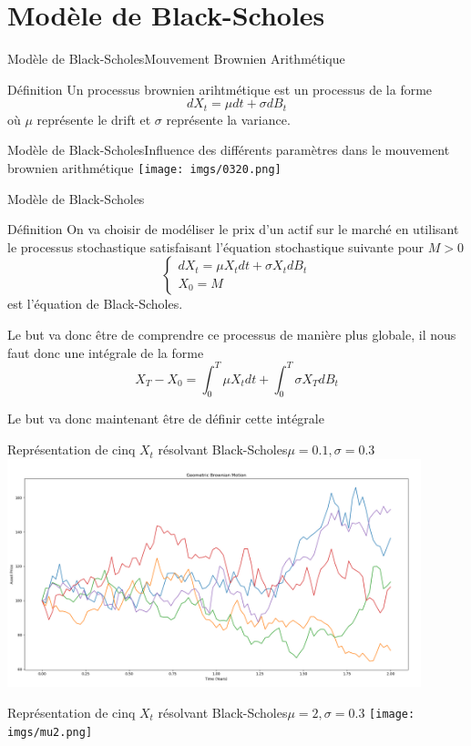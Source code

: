 \documentclass{beamer}
\newcommand{\1}{\mathmybb{1}}
\begin{document}
\section{Modèle de Black-Scholes}
\begin{frame}{Modèle de Black-Scholes}{Mouvement Brownien Arithmétique}
  \begin{block}{Définition}
    Un processus brownien arihtmétique est un processus de la forme
    \begin{equation}
      dX_{t} = \mu dt + \sigma dB_{t}
    \end{equation}
    où $\mu$ représente le drift et $\sigma$ représente la variance.
    \end{block}
  \end{frame}
  \begin{frame}{Modèle de Black-Scholes}{Influence des différents paramètres dans le mouvement brownien arithmétique}
    \texttt{[image: imgs/0320.png]}
  \end{frame}
\begin{frame}{Modèle de Black-Scholes}
  \begin{block}{Définition}
    On va choisir de modéliser le prix d'un actif sur le marché en utilisant le processus stochastique satisfaisant l'équation stochastique suivante pour $M > 0$
    \begin{equation}
      \begin{cases}
        dX_{t} = \mu X_{t} dt + \sigma X_{t} dB_{t} \\
        X_{0} = M
      \end{cases}
      \end{equation}
      est l'équation de Black-Scholes. \\
    \end{block}
    \pause
    \begin{alertblock}{}
    Le but va donc être de comprendre ce processus de manière plus globale, il nous faut donc une intégrale de la forme
    \[
      X_{T} - X_{0} = \int_0^{T} \mu X_{t} dt + \int_{0}^{T} \sigma X_{T} dB_{t}
    \]
  \end{alertblock}
  \pause
  Le but va donc maintenant être de définir cette intégrale
\end{frame}
 \begin{frame}{Représentation de cinq $X_{t}$ résolvant Black-Scholes}{$\mu =0.1, \sigma =0.3$}
   \includegraphics[width=12cm]{imgs/bs5.png}
 \end{frame}
 \begin{frame}{Représentation de cinq $X_{t}$ résolvant Black-Scholes}{$\mu =2, \sigma =0.3$}
   \texttt{[image: imgs/mu2.png]}
 \end{frame}
\end{document}
